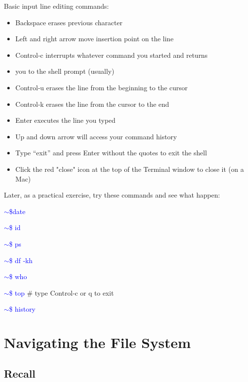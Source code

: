 \documentclass{beamer}[10pt, usepdftitle=false, handout]
\newcommand*{\blue}{\textcolor{blue}}
\begin{document}
	\begin{frame}
	
	Basic input line editing commands:
	\vspace*{1em}
	\begin{itemize}
	\item{Backspace erases previous character}
	\item{Left and right arrow move insertion point on the line}
	\item{Control‐c interrupts whatever command you started and returns}
	\item{you to the shell prompt (usually)}
	\item{Control‐u erases the line from the beginning to the cursor}
	\item{Control‐k erases the line from the cursor to the end}
	\item{Enter executes the line you typed}
	\item{Up and down arrow will access your command history}
	\item{Type “exit” and press Enter without the quotes to exit the shell}
	\item{Click the red "close" icon at the top of the Terminal window to close
	it (on a Mac)}
	\end{itemize}
		
	\end{frame}	
	
	\begin{frame}
	
	Later, as a practical exercise, try these commands and see what happen:
	\vspace*{1em}
	
	\blue{$\sim$\$date}
	
	\blue{$\sim$\$ id}
	
	\blue{$\sim$\$ ps}
	
	\blue{$\sim$\$ df ‐kh}
	
	\blue{$\sim$\$ who}
	
	\blue{$\sim$\$ top} \# type Control‐c or q to exit
	
	\blue{$\sim$\$ history}
		
	\end{frame}		
	
	\section{Navigating the File System}	

	\subsection{Recall}
		
\end{document}
